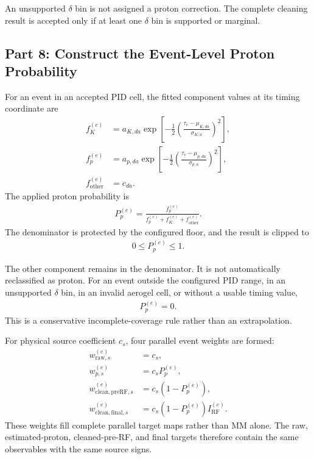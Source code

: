 \documentclass[11pt]{article}
\begin{document}
An unsupported $\delta$ bin is not assigned a proton correction.  The complete
cleaning result is accepted only if at least one $\delta$ bin is supported or
marginal.

\subsection{Part 8: Construct the Event-Level Proton Probability}

For an event in an accepted PID cell, the fitted component values at its timing
coordinate are
\begin{align}
  f_K^{(e)}
  &=a_{K,da}
    \exp\!\left[-\frac{1}{2}
      \left(\frac{\tau_e-\mu_{K,da}}{\sigma_{K,a}}\right)^2\right],\\
  f_p^{(e)}
  &=a_{p,da}
    \exp\!\left[-\frac{1}{2}
      \left(\frac{\tau_e-\mu_{p,da}}{\sigma_{p,a}}\right)^2\right],\\
  f_{\mathrm{other}}^{(e)}&=c_{da}.
\end{align}
The applied proton probability is
\begin{align}
  P_p^{(e)}
  =\frac{f_p^{(e)}}
         {f_p^{(e)}+f_K^{(e)}+f_{\mathrm{other}}^{(e)}}.
\end{align}
The denominator is protected by the configured floor, and the result is clipped
to
\begin{align}
  0\leq P_p^{(e)}\leq1.
\end{align}

The other component remains in the denominator.  It is not automatically
reclassified as proton.  For an event outside the configured PID range, in an
unsupported $\delta$ bin, in an invalid aerogel cell, or without a usable timing
value,
\begin{align}
  P_p^{(e)}=0.
\end{align}
This is a conservative incomplete-coverage rule rather than an extrapolation.

For physical source coefficient $c_s$, four parallel event weights are formed:
\begin{align}
  w_{\mathrm{raw},s}^{(e)}
    &=c_s,\\
  w_{p,s}^{(e)}
    &=c_sP_p^{(e)},\\
  w_{\mathrm{clean,preRF},s}^{(e)}
    &=c_s\left(1-P_p^{(e)}\right),\\
  w_{\mathrm{clean,final},s}^{(e)}
    &=c_s\left(1-P_p^{(e)}\right)I_{\mathrm{RF}}^{(e)}.
\end{align}
These weights fill complete parallel target maps rather than MM alone.  The raw,
estimated-proton, cleaned-pre-RF, and final targets therefore contain the same
observables with the same source signs.
\end{document}
